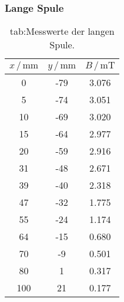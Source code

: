     \subsubsection{Lange Spule}
    \begin{table}
    \centering
    \caption{tab:Messwerte der langen Spule.}
    \label{tab:langSp}
        \begin{tabular}{S[table-format=3.0] S[table-format=2.0] S[table-format=2.2]}
            \toprule
            {$x\,/\,\mathrm{mm}$} & {$y\,/\,\mathrm{mm}$} & {$B\,/\,\mathrm{mT}$}\\
               & -79   & 3.076 \\
            5   & -74   & 3.051 \\
            10  & -69   & 3.020 \\
            15  & -64   & 2.977 \\
            20  & -59   & 2.916 \\
            31  & -48   & 2.671 \\
            39  & -40   & 2.318 \\
            47  & -32   & 1.775 \\
            55  & -24   & 1.174 \\
            64  & -15   & 0.680 \\
            70  & -9    & 0.501 \\
            80  & 1     & 0.317 \\
            100 & 21    & 0.177 \\
            \bottomrule
        \end{tabular}
    \end{table}